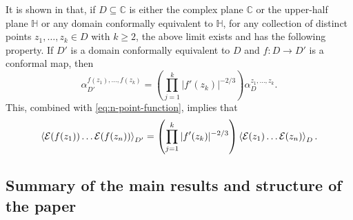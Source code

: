 \documentclass[a4paper,11pt]{article}
\begin{document}
It is shown in \cite{camia2021scalar} that, if $D \subseteq{\mathbb C}$ is either the complex plane $\mathbb C$ or the upper-half plane $\mathbb H$ or any domain conformally equivalent to $\mathbb H$, for any collection of distinct points $z_1,\ldots,z_k \in D$ with $k \geq 2$, the above limit exists and has the following property.
If $D'$ is a domain conformally equivalent to $D$ and $f:D \to D'$ is a conformal map, then
\begin{equation} \label{eq:conf-cov-mu}
    \alpha_{D'}^{f(z_1),\ldots,f(z_k)} = \left( \prod_{j=1}^k |f'(z_k)|^{-2/3} \right) \alpha_D^{z_1,\ldots,z_k}.
\end{equation}
This, combined with \eqref{eq:n-point-function}, implies that
\begin{equation} \label{eq:conf-cov}
    \Braket{\mathcal{E}(f(z_1)) \ldots \mathcal{E}(f(z_n))}_{D'} = \left( \prod_{j=1}^k |f'(z_k)|^{-2/3} \right) \Braket{\mathcal{E}(z_1) \ldots \mathcal{E}(z_n)}_{D}.
\end{equation}

\medskip

\subsection{Summary of the main results and structure of the paper} \label{sec:main-results}
\end{document}

